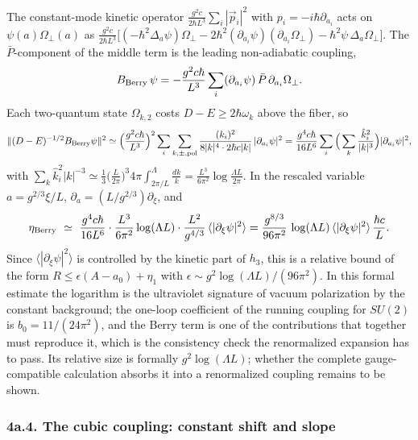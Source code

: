 \documentclass[11pt,a4paper]{article}
\begin{document}
The constant-mode kinetic operator
\(\frac{g^2c}{2\hbar L^3}\sum_i|\vec p_i|^2\) with
\(p_i=-i\hbar\partial_{a_i}\) acts on \(\psi(a)\Omega_\perp(a)\) as
\(\frac{g^2c}{2\hbar L^3}\big[(-\hbar^2\Delta_a\psi)\Omega_\perp-2\hbar^2(\partial_{a_i}\psi)(\partial_{a_i}\Omega_\perp)-\hbar^2\psi\,\Delta_a\Omega_\perp\big]\).
The \(\bar P\)-component of the middle term is the leading non-adiabatic
coupling,
\[B_{\rm Berry}\,\psi=-\frac{g^2c\hbar}{L^3}\sum_i(\partial_{a_i}\psi)\,\bar P\,\partial_{a_i}\Omega_\perp .\]
Each two-quantum state \(\Omega_{k,2}\) costs \(D-E\ge2\hbar\omega_k\)
above the fiber, so \[\|(D-E)^{-1/2}B_{\rm Berry}\psi\|^2
\simeq\Big(\frac{g^2c\hbar}{L^3}\Big)^2\sum_i\sum_{k,\pm,{\rm pol}}\frac{(k_i)^2}{8|k|^4\cdot2\hbar c|k|}\,|\partial_{a_i}\psi|^2
=\frac{g^4c\hbar}{16L^6}\sum_i\Big(\sum_k\frac{\hat k_i^2}{|k|^3}\Big)|\partial_{a_i}\psi|^2 ,\]
with
\(\sum_k\hat k_i^2|k|^{-3}\simeq\frac13\big(\frac L{2\pi}\big)^3 4\pi\int_{2\pi/L}^{\Lambda}\frac{dk}{k}=\frac{L^3}{6\pi^2}\log\frac{\Lambda L}{2\pi}\).
In the rescaled variable \(a=g^{2/3}\xi/L\),
\(\partial_a=(L/g^{2/3})\partial_\xi\), and
\[\eta_{\rm Berry}\ \simeq\ \frac{g^4c\hbar}{16L^6}\cdot\frac{L^3}{6\pi^2}\log(\Lambda L)\cdot\frac{L^2}{g^{4/3}}\,\langle|\partial_\xi\psi|^2\rangle
=\frac{g^{8/3}}{96\pi^2}\,\log(\Lambda L)\,\langle|\partial_\xi\psi|^2\rangle\,\frac{\hbar c}{L}.\]
Since \(\langle|\partial_\xi\psi|^2\rangle\) is controlled by the
kinetic part of \(h_3\), this is a relative bound of the form
\(R\le\epsilon(A-a_0)+\eta_1\) with
\(\epsilon\sim g^2\log(\Lambda L)/(96\pi^2)\). In this formal estimate
the logarithm is the ultraviolet signature of vacuum polarization by the
constant background; the one-loop coefficient of the running coupling
for \(SU(2)\) is \(b_0=11/(24\pi^2)\), and the Berry term is one of the
contributions that together must reproduce it, which is the consistency
check the renormalized expansion has to pass. Its relative size is
formally \(g^2\log(\Lambda L)\); whether the complete gauge-compatible
calculation absorbs it into a renormalized coupling remains to be shown.

\hypertarget{a.4.-the-cubic-coupling-constant-shift-and-slope}{%
\subsubsection{4a.4. The cubic coupling: constant shift and
slope}\label{a.4.-the-cubic-coupling-constant-shift-and-slope}}
\end{document}
